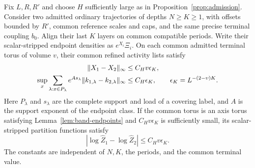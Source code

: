\begin{proposition}
\label{prop:endpoint-comparison}
Fix $L,R,R'$ and choose $H$ sufficiently large as in
Proposition~\ref{prop:admission}.  Consider two admitted ordinary
trajectories of depths $N\ge K\ge1$, with offsets bounded by $R'$,
common reference scales and caps, and the same precise terminal
coupling $b_0$.  Align their last $K$ layers on common compatible
periods.  Write their scalar-stripped endpoint densities as
$e^{X_i}\Xi_i$.  On each common admitted terminal torus of volume
$v$, their common refined activity lists satisfy
\begin{align}
 \|X_1-X_2\|_\infty
    &\le C_Hv\epsilon_K,\notag\\
 \sup_x\sum_{\lambda:x\in P_\lambda}
 e^{As_\lambda}\|k_{1,\lambda}-k_{2,\lambda}\|_\infty
    &\le C_H\epsilon_K,
 \qquad \epsilon_K=L^{-(2-\upsilon)K}.
 \label{eq:offset-endpoint-comparison}
\end{align}
Here $P_\lambda$ and $s_\lambda$ are the complete support and load
of a covering label, and $A$ is the support exponent of the endpoint
class.  If the common torus is an axis torus satisfying
Lemma~\ref{lem:band-endpoints} and $C_Hv\epsilon_K$ is sufficiently
small, its scalar-stripped partition functions satisfy
\begin{equation}
 |\log\widehat Z_1-\log\widehat Z_2|
       \le C_Hv\epsilon_K.
 \label{eq:offset-endpoint-logZ}
\end{equation}
The constants are independent of $N,K$, the periods, and the common
terminal value.
\end{proposition}


